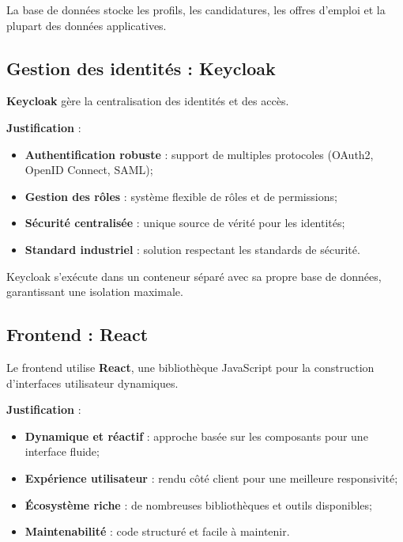 La base de données stocke les profils, les candidatures, les offres d'emploi et la plupart des données applicatives.


\subsection{Gestion des identités : Keycloak}
\label{subsec:keycloak-identities}

\textbf{Keycloak} gère la centralisation des identités et des accès.

\textbf{Justification} :

\begin{itemize}
    \item \textbf{Authentification robuste} : support de multiples protocoles (OAuth2, OpenID Connect, SAML);
    
    \item \textbf{Gestion des rôles} : système flexible de rôles et de permissions;
    
    \item \textbf{Sécurité centralisée} : unique source de vérité pour les identités;
    
    \item \textbf{Standard industriel} : solution respectant les standards de sécurité.
\end{itemize}

Keycloak s'exécute dans un conteneur séparé avec sa propre base de données, garantissant une isolation maximale.


\subsection{Frontend : React}
\label{subsec:frontend-react}

Le frontend utilise \textbf{React}, une bibliothèque JavaScript pour la construction d'interfaces utilisateur dynamiques.

\textbf{Justification} :

\begin{itemize}
    \item \textbf{Dynamique et réactif} : approche basée sur les composants pour une interface fluide;
    
    \item \textbf{Expérience utilisateur} : rendu côté client pour une meilleure responsivité;
    
    \item \textbf{Écosystème riche} : de nombreuses bibliothèques et outils disponibles;
    
    \item \textbf{Maintenabilité} : code structuré et facile à maintenir.
\end{itemize}

